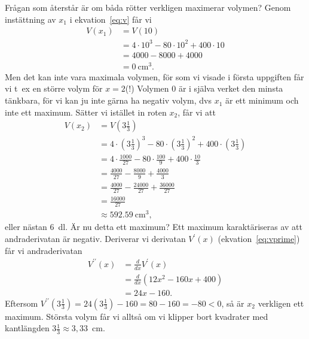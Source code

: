 \documentclass[a4paper,12pt]{article}
\begin{document}
Frågan som återstår är om båda rötter verkligen maximerar volymen?
Genom instättning av $x_1$ i ekvation~\ref{eq:v} får vi
%
\begin{align*}
  V(x_1) &= V(10) \\
         &= 4 \cdot 10^3 - 80 \cdot 10^2 + 400 \cdot 10 \\
         &= 4000         - 8000          + 4000         \\
         &= 0~\text{cm}^3. 
\end{align*}
%
Men det kan inte vara maximala volymen, för som vi visade i första
uppgiften får vi t~ex en större volym för $x = 2$(!) Volymen 0 är
i själva verket den minsta tänkbara, för vi kan ju inte gärna ha negativ
volym, dvs $x_1$ är ett minimum och inte ett maximum. Sätter vi
istället in roten $x_2$, får vi att
%
\begin{align*}
  V(x_2) &= V\left(3\frac{1}{3}\right) \\
         &= 4 \cdot    \left(3\frac{1}{3}\right)^3 -
            80 \cdot   \left(3\frac{1}{3}\right)^2 +
            400 \cdot  \left(3\frac{1}{3}\right) \\
         &= 4 \cdot   \frac{1000}{27} -
            80 \cdot  \frac{100}{9} +
            400 \cdot \frac{10}{3} \\
         &= \frac{4000}{27} -
            \frac{8000}{9} +
            \frac{4000}{3} \\
         &= \frac{4000}{27} -
            \frac{24000}{27} +
            \frac{36000}{27} \\
         &= \frac{16000}{27} \\
         &\approx 592.59~\text{cm}^3, 
\end{align*}
%
eller nästan $6$~dl. Är nu detta ett maximum? Ett maximum karaktäriseras
av att andraderivatan är negativ. Deriverar vi derivatan $V^\prime(x)$
(ekvation~\ref{eq:vprime}) får vi andraderivatan
%
\begin{align*}
  V^{\prime\prime}(x) &= \frac{d}{dx} V^\prime(x) \\
                      &= \frac{d}{dx} (12x^2 - 160x + 400) \\
                      &= 24x - 160.
\end{align*}
%
Eftersom
  $V^{\prime\prime}(3\frac{1}{3}) = 24\left(3\frac{1}{3}\right)-160
                                  = 80 - 160 
                                  = -80 
                                  < 0$, 
så är $x_2$ verkligen ett maximum. Största volym får vi alltså om vi 
klipper bort kvadrater med kantlängden $3\frac{1}{3} \approx 3,33$~cm.
\end{document}
